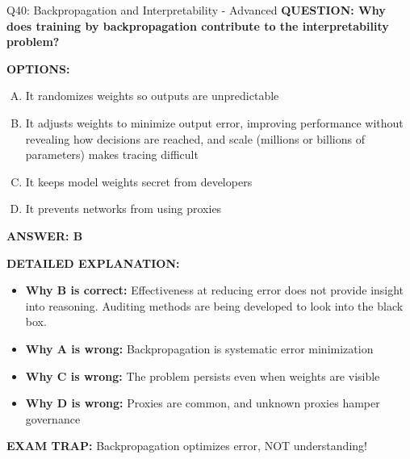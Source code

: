 \documentclass[8pt]{beamer}
\begin{document}
\begin{frame}[shrink=6]{Q40: Backpropagation and Interpretability - Advanced}
\fontsize{6.5}{7.5}\selectfont
\textbf{QUESTION: Why does training by backpropagation contribute to the interpretability problem?}

\vspace{0.1cm}
\textbf{OPTIONS:}
\begin{enumerate}[A.]
\item It randomizes weights so outputs are unpredictable
\item It adjusts weights to minimize output error, improving performance without revealing how decisions are reached, and scale (millions or billions of parameters) makes tracing difficult
\item It keeps model weights secret from developers
\item It prevents networks from using proxies
\end{enumerate}

\vspace{0.1cm}
\textcolor{myblue}{\textbf{ANSWER: B}}

\vspace{0.1cm}
\textbf{DETAILED EXPLANATION:}
\begin{itemize}
\item \textbf{Why B is correct:} Effectiveness at reducing error does not provide insight into reasoning. Auditing methods are being developed to look into the black box.
\item \textbf{Why A is wrong:} Backpropagation is systematic error minimization
\item \textbf{Why C is wrong:} The problem persists even when weights are visible
\item \textbf{Why D is wrong:} Proxies are common, and unknown proxies hamper governance
\end{itemize}

\textcolor{myred}{\textbf{EXAM TRAP:}} Backpropagation optimizes error, NOT understanding!
\end{frame}
\end{document}
